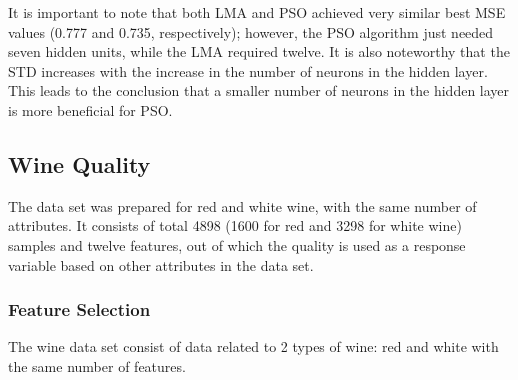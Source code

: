 \begin{table}[htbp]
    \centering
    \caption{Summary of the tests performed with PSO in fish test data set.}
    \label{tab:psofish}
\end{table}

It is important to note that both LMA and PSO achieved very similar best MSE values (0.777 and 0.735, respectively); however, the PSO algorithm just needed seven hidden units, while the LMA required twelve. It is also noteworthy that the STD increases with the increase in the number of neurons in the hidden layer. This leads to the conclusion that a smaller number of neurons in the hidden layer is more beneficial for PSO.

\subsection{Wine Quality}

The data set was prepared for red and white wine, with the same number of attributes. It consists of total 4898 (1600 for red and 3298 for white wine) samples and twelve features, out of which the quality is used as a response variable based on other attributes in the data set.

\subsubsection{Feature Selection}

The wine data set consist of data related to 2 types of wine: red and white with the same number of features.

